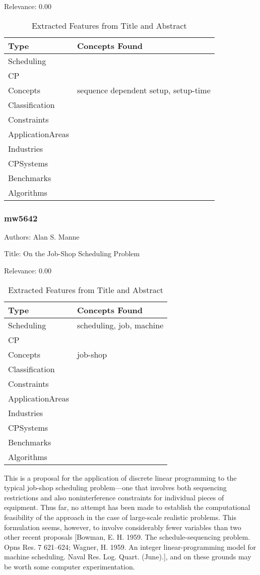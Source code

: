 Relevance:  0.00

{\scriptsize
\begin{longtable}{p{2cm}p{20cm}}
\caption{Extracted Features from Title and Abstract}\\ \toprule
Type & Concepts Found\\ \midrule
\endhead
\bottomrule
\endfoot
Scheduling & \\ 
CP & \\ 
Concepts & sequence dependent setup, setup-time\\ 
Classification & \\ 
Constraints & \\ 
ApplicationAreas & \\ 
Industries & \\ 
CPSystems & \\ 
Benchmarks & \\ 
Algorithms & \\ 
\end{longtable}
}



\subsubsection{mw5642}
\label{mw:mw5642}

Authors: Alan S. Manne

Title: On the Job-Shop Scheduling Problem

Relevance:  0.00

{\scriptsize
\begin{longtable}{p{2cm}p{20cm}}
\caption{Extracted Features from Title and Abstract}\\ \toprule
Type & Concepts Found\\ \midrule
\endhead
\bottomrule
\endfoot
Scheduling & scheduling, job, machine\\ 
CP & \\ 
Concepts & job-shop\\ 
Classification & \\ 
Constraints & \\ 
ApplicationAreas & \\ 
Industries & \\ 
CPSystems & \\ 
Benchmarks & \\ 
Algorithms & \\ 
\end{longtable}
}

  This is a proposal for the application of discrete linear programming to the typical job-shop scheduling problem—one that involves both sequencing restrictions and also noninterference constraints for individual pieces of equipment. Thus far, no attempt has been made to establish the computational feasibility of the approach in the case of large-scale realistic problems. This formulation seems, however, to involve considerably fewer variables than two other recent proposals [Bowman, E. H. 1959. The schedule-sequencing problem. Opns Res. 7 621–624; Wagner, H. 1959. An integer linear-programming model for machine scheduling. Naval Res. Log. Quart. (June).], and on these grounds may be worth some computer experimentation.  

